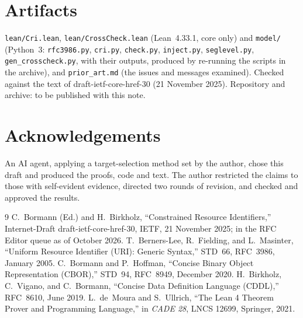 \documentclass[11pt,a4paper]{article}
\theoremstyle{remark}
\newcommand{\lean}[1]{\texttt{#1}}
\begin{document}
\section*{Artifacts}
\lean{lean/Cri.lean}, \lean{lean/CrossCheck.lean} (Lean~4.33.1, core only) and \lean{model/}
(Python~3: \lean{rfc3986.py}, \lean{cri.py}, \lean{check.py}, \lean{inject.py}, \lean{seglevel.py},
\lean{gen\_crosscheck.py}, with their outputs, produced by re-running the scripts in the archive), and
\lean{prior\_art.md} (the issues and messages examined). Checked against the text of
draft-ietf-core-href-30 (21 November 2025). Repository and archive: to be published with this note.

\section*{Acknowledgements}
An AI agent, applying a target-selection method set by the author, chose this draft and produced the
proofs, code and text. The author restricted the claims to those with self-evident evidence, directed
two rounds of revision, and checked and approved the results.

\begin{thebibliography}{9}\small
{} C.~Bormann (Ed.) and H.~Birkholz, ``Constrained Resource Identifiers,''
  Internet-Draft draft-ietf-core-href-30, IETF, 21 November 2025; in the RFC Editor queue as of
  October 2026.
 T.~Berners-Lee, R.~Fielding, and L.~Masinter, ``Uniform Resource Identifier (URI):
  Generic Syntax,'' STD~66, RFC~3986, January 2005.
 C.~Bormann and P.~Hoffman, ``Concise Binary Object Representation (CBOR),'' STD~94,
  RFC~8949, December 2020.
 H.~Birkholz, C.~Vigano, and C.~Bormann, ``Concise Data Definition Language (CDDL),''
  RFC~8610, June 2019.
 L.~de~Moura and S.~Ullrich, ``The Lean 4 Theorem Prover and Programming Language,''
  in \emph{CADE 28}, LNCS 12699, Springer, 2021.
\end{thebibliography}
\end{document}
